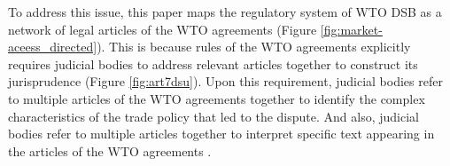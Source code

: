To address this issue, 
this paper maps 
the regulatory system of WTO DSB 
as a network of legal articles 
of the WTO agreements (Figure \ref{fig:market-aceess_directed}). 
This is because rules of the WTO agreements
explicitly requires judicial bodies to address 
relevant articles together to construct its jurisprudence (Figure \ref{fig:art7dsu}).
Upon this requirement, judicial bodies refer to 
multiple articles of the WTO agreements together
to identify the complex characteristics of the trade policy that led to the dispute.
And also, judicial bodies refer to multiple articles together to interpret specific text 
appearing in the articles of the WTO agreements
\citep{oesch2003standards}.





